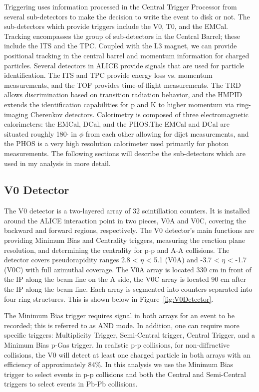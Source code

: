 Triggering uses information processed in the Central Trigger Processor from several sub-detectors to make the decision to write the event to disk or not. The sub-detectors which provide triggers include the V0, T0, and the EMCal. Tracking encompasses the group of sub-detectors in the Central Barrel; these include the ITS and the TPC. Coupled with the L3 magnet, we can provide positional tracking in the central barrel and momentum information for charged particles. Several detectors in ALICE provide signals that are used for particle identification. The ITS and TPC provide energy loss vs. momentum measurements, and the TOF provides time-of-flight measurements. The TRD allows discrimination based on transition radiation behavior, and the HMPID extends the identification capabilities for p and K to higher momentum via ring-imaging Cherenkov detectors. Calorimetry is composed of three electromagnetic calorimeters: the EMCal, DCal, and the PHOS.The EMCal and DCal are situated roughly 180$\cdot$ in $\phi$ from each other allowing for dijet measurements, and the PHOS is a very high resolution calorimeter used primarily for photon measurements. The following sections will describe the sub-detectors which are used in my analysis in more detail.

\subsection*{V0 Detector}

The V0 detector is a two-layered array of 32 scintillation counters. It is installed around the ALICE interaction point in two pieces, V0A and V0C, covering the backward and forward regions, respectively. The V0 detector's main functions are providing Minimum Bias and Centrality triggers, measuring the reaction plane resolution, and determining the centrality for p-p and A-A collisions. The detector covers pseudorapidity ranges 2.8 < $\eta$ < 5.1 (V0A) and -3.7 < $\eta$ < -1.7 (V0C) with full azimuthal coverage. The V0A array is located 330 cm in front of the IP along the beam line on the A side, the V0C array is located 90 cm after the IP along the beam line. Each array is segmented into counters separated into four ring structures. This is shown below in Figure~\ref*{fig:V0Detector}.

The Minimum Bias trigger requires signal in both arrays for an event to be recorded; this is referred to as AND mode. In addition, one can require more specific triggers: Multiplicity Trigger, Semi-Central trigger, Central Trigger, and a Minimum Bias p-Gas trigger. In realistic p-p collisions, for non-diffractive collisions, the V0 will detect at least one charged particle in both arrays with an efficiency of approximately 84\%. In this analysis we use the Minimum Bias trigger to select events in p-p collisions and both the Central and Semi-Central triggers to select events in Pb-Pb collisions.

